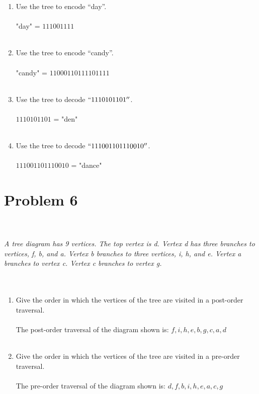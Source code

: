 \documentclass{amsart}
\theoremstyle{definition}
\theoremstyle{Exercise}
\theoremstyle{remark}
\theoremstyle{rule}
\numberwithin{equation}{section}
\begin{document}
\begin{enumerate}[label=(\alph*)]
\item Use the tree to encode ``day''.\\\\
"day" = $111001111$
\\\\
\item Use the tree to encode ``candy''.\\\\
"candy" = $11000110111101111$
\\\\
\item Use the tree to decode $``1110101101''$.\\\\
$1110101101$ = "den"
\\\\
\item Use the tree to decode $``111001101110010''$.\\\\
$111001101110010$ = "dance"

\end{enumerate}

 \newpage
\vspace*{0.2in}
\section*{Problem 6}

\\\\
{\color{blue}{\bf Figure 14:} \emph{A tree diagram has 9 vertices. The top vertex is d. Vertex d has three branches to vertices, f, b, and a. Vertex b branches to three vertices, i, h, and e. Vertex a branches to vertex c. Vertex c branches to vertex g.
\\
}
}
\\
\\
\begin{enumerate}[label=(\alph*)]
\item Give the order in which the vertices of the tree are visited in a post-order traversal.\\\\
The post-order traversal of the diagram shown is: $f, i ,h, e, b, g, c, a, d$
\\\\
\item Give the order in which the vertices of the tree are visited in a pre-order traversal.\\\\
The pre-order traversal of the diagram shown is: $d, f, b, i, h, e, a, c, g$
\\\\
\end{enumerate}
\end{document}
